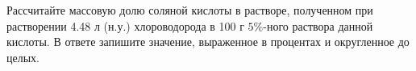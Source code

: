 
Рассчитайте
массовую долю соляной кислоты в растворе, полученном при растворении 4.48 л (н.у.)
хлороводорода в 100 г $5\%$-ного раствора данной кислоты. В ответе запишите
значение, выраженное в процентах и округленное до целых.

